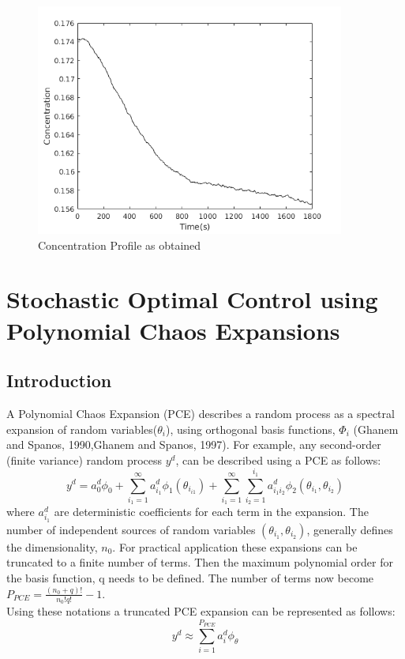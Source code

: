 \begin{figure}[h!] 

\begin{center}
\includegraphics[width=4in]{Sconc.png}
\end{center}
\caption{Concentration Profile as obtained}
\end{figure}
\clearpage

\section{Stochastic Optimal Control using Polynomial Chaos Expansions}

\subsection{Introduction}
A Polynomial Chaos Expansion (PCE) describes a random process as a spectral expansion of random variables($\theta_{i}$), using orthogonal basis functions, $\Phi_{i}$ (Ghanem and Spanos, 1990,Ghanem and Spanos, 1997). For example, any second-order (finite variance) random process $y^{d}$, can be described using a PCE as follows:
\begin{equation}
y^{d} = a_{0}^{d}\phi_{0} + \sum_{i_{1}=1}^{\infty} a_{i_{1}}^{d}\phi_{1}(\theta_{i_{i1}}) + \sum_{i_{1}=1}^{\infty}\sum_{i_{2}=1}^{i_{1}} a_{i_{1}i_{2}}^d\phi_{2}(\theta_{i_{1}},\theta_{i_{2}})
\end{equation}
where $a_{i_{1}}^d$  are deterministic coefficients for each term in the expansion. The number of independent sources of random variables $(\theta_{i_{1}}, \theta_{i_{2}})$, generally defines the dimensionality, $n_{0}$. For practical application these expansions can be
truncated to a finite number of terms. Then the maximum polynomial order for the basis function, q needs to be defined.
The number of terms now become $P_{PCE} = \frac{(n_{0}+q)!}{n_{0}!q!} -1 $. \\
Using these notations a truncated PCE expansion can be represented as follows:
\begin{equation}
y^{d} \approx \sum_{i=1}^{P_{PCE}} a_{i}^{d}\phi_{\theta}
\end{equation}

